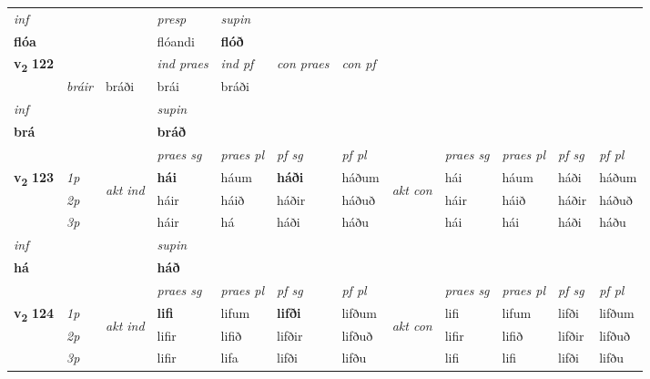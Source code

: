 \begin{longtable}[l]{X>{\footnotesize\itshape}llXXXXlXXXX}
   {\textit{inf}} & &     & \textit{presp} & \textit{supin}   \\*
  {\textbf{flóa}} & &     & flóandi &  \textbf{flóð}   \\*

\midrule

\multirow{2}{*}{{{\textbf{v{\textsubscript{2}}} \Large{\textbf{122}}}}}  &&&  \textit{ind praes} & \textit{ind pf} & \textit{con praes} & \textit{con pf} \\*
\multicolumn{3}{r}{\textit{það}} & bráir & bráði & brái & bráði \\*

\cmidrule{4-7}
   {\textit{inf}} & &      & \textit{supin}   \\*
  {\textbf{brá}} & &      &  \textbf{bráð}   \\*

\midrule

 & &   & \textit{praes sg}  & \textit{praes pl}    & \textit{ pf sg} & \textit{pf pl} & & \textit{praes sg}  & \textit{praes pl}    & \textit{pf sg} & \textit{pf pl }  \\ \cmidrule{4-7} \cmidrule{9-12}
 \multirow{2}{*}{{{\textbf{v{\textsubscript{2}}} \Large{\textbf{123}}}}}  & 1p & \multirow{3}{*}{\begin{turn}{90}\textit{akt ind}\end{turn}} & \textbf{hái} & háum & \textbf{háði} & háðum & \multirow{3}{*}{\begin{turn}{90}\textit{akt con}\end{turn}} &hái & háum & háði & háðum\\*
 & 2p &  &  háir  & háið & háðir & háðuð & & háir & háið & háðir & háðuð \\*
 & 3p &  & háir & há & háði & háðu & & hái & hái& háði & háðu \\*
\cmidrule{4-7} \cmidrule{9-12}

   {\textit{inf}} & &      & \textit{supin}   \\*
  {\textbf{há}} & &      &  \textbf{háð}   \\*

\midrule

 & &   & \textit{praes sg}  & \textit{praes pl}    & \textit{ pf sg} & \textit{pf pl} & & \textit{praes sg}  & \textit{praes pl}    & \textit{pf sg} & \textit{pf pl }  \\ \cmidrule{4-7} \cmidrule{9-12}
 \multirow{2}{*}{{{\textbf{v{\textsubscript{2}}} \Large{\textbf{124}}}}}  & 1p & \multirow{3}{*}{\begin{turn}{90}\textit{akt ind}\end{turn}} & \textbf{lifi} & lifum & \textbf{lifði} & lifðum & \multirow{3}{*}{\begin{turn}{90}\textit{akt con}\end{turn}} &lifi & lifum & lifði & lifðum\\*
 & 2p &  &  lifir  & lifið & lifðir & lifðuð & & lifir & lifið & lifðir & lifðuð \\*
 & 3p &  & lifir & lifa & lifði & lifðu & & lifi & lifi& lifði & lifðu \\*
\cmidrule{4-7} \cmidrule{9-12}


\end{longtable}
